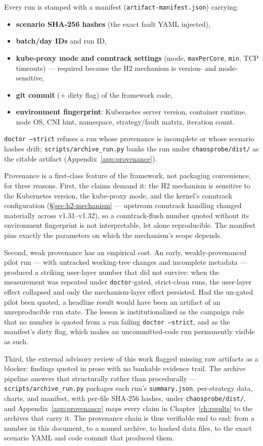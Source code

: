 Every run is stamped with a manifest (\texttt{artifact-manifest.json}) carrying:

\begin{itemize}
\item \textbf{scenario SHA-256 hashes} (the exact fault YAML injected),
\item \textbf{batch/day IDs} and run ID,
\item \textbf{kube-proxy mode and conntrack settings} (mode, \texttt{maxPerCore}, \texttt{min},
  TCP timeouts) --- required because the H2 mechanism is version- and
  mode-sensitive,
\item \textbf{git commit} (+ dirty flag) of the framework code,
\item \textbf{environment fingerprint}: Kubernetes server version, container runtime,
  node OS, CNI hint, namespace, strategy/fault matrix, iteration count.
\end{itemize}

\texttt{doctor --strict} refuses a run whose provenance is incomplete or whose
scenario hashes drift; \texttt{scripts/archive\_run.py} banks the run under
\texttt{chaosprobe/dist/} as the citable artifact (Appendix~\ref{app:provenance}).

Provenance is a first-class feature of the framework, not packaging
convenience, for three reasons. First, the claims demand it: the H2
mechanism is sensitive to the Kubernetes version, the kube-proxy mode, and
the kernel's conntrack configuration (\S\ref{sec:h2-mechanism} --- upstream conntrack handling
changed materially across v1.31--v1.32), so a conntrack-flush number quoted
without its environment fingerprint is not interpretable, let alone
reproducible. The manifest pins exactly the parameters on which the
mechanism's scope depends.

Second, weak provenance has an empirical cost. An early, weakly-provenanced
pilot run --- with untracked working-tree changes and incomplete metadata ---
produced a striking user-layer number that did not survive: when the
measurement was repeated under \texttt{doctor}-gated, strict-clean runs, the
user-layer effect collapsed and only the mechanism-layer effect persisted. Had
the un-gated pilot been quoted, a headline result would have been an artifact of
an unreproducible run state. The lesson is institutionalized as the campaign
rule that no number is quoted from a run failing \texttt{doctor --strict}, and as
the manifest's dirty flag, which makes an uncommitted-code run permanently
visible as such.

Third, the external advisory review of this work flagged missing raw
artifacts as a blocker: findings quoted in prose with no bankable evidence
trail. The archive pipeline answers that structurally rather than
procedurally --- \texttt{scripts/archive\_run.py} packages each run's \texttt{summary.json},
per-strategy data, charts, and manifest, with per-file SHA-256 hashes, under
\texttt{chaosprobe/dist/}, and Appendix~\ref{app:provenance} maps every claim in Chapter~\ref{ch:results} to the
archives that carry it. The provenance chain is thus verifiable end to end:
from a number in this document, to a named archive, to hashed data files, to
the exact scenario YAML and code commit that produced them.
